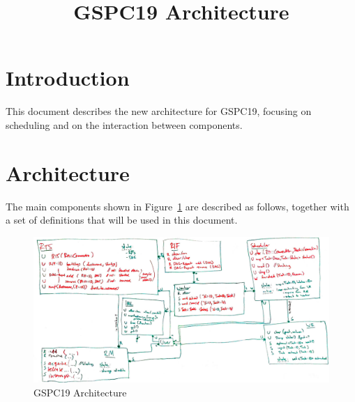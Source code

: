 \documentclass[10pt]{article}
\title{GSPC19 Architecture}
\date{}
\begin{document}
\maketitle


\section{Introduction}
This document describes the new architecture for GSPC19, focusing on scheduling
and on the interaction between components.

\section{Architecture}
The main components shown in Figure~\ref{fig:architecture} are described as follows, 
together with a set of definitions that will be used in this document.
\begin{figure}[t]
    \centering
    \includegraphics[width=.9\linewidth]{./api_overview.jpg}
    \caption{GSPC19 Architecture}
    \label{fig:architecture}
\end{figure}
%
\end{document}
